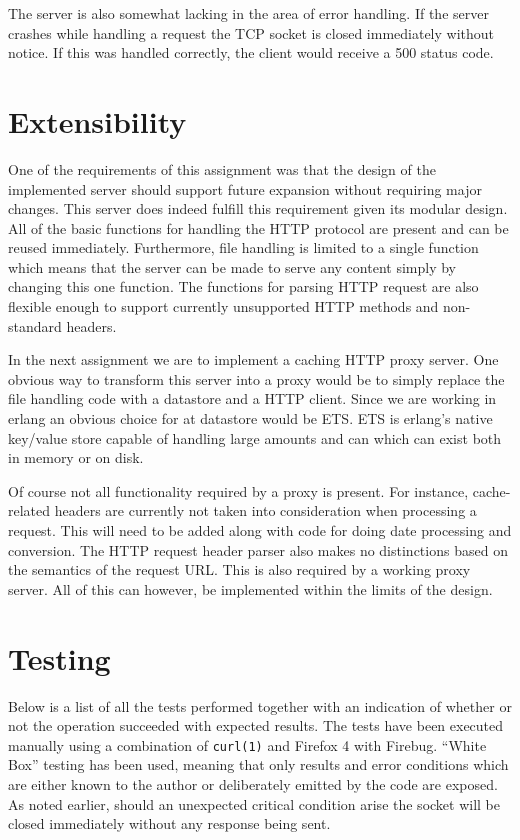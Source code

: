 \documentclass{sig-alternate}
\begin{document}
The server is also somewhat lacking in the area of error handling. If
the server crashes while handling a request the TCP socket is closed
immediately without notice. If this was handled correctly, the client
would receive a 500 status code.

\section{Extensibility}

One of the requirements of this assignment was that the design of the
implemented server should support future expansion without requiring
major changes. This server does indeed fulfill this requirement given
its modular design. All of the basic functions for handling the HTTP
protocol are present and can be reused immediately. Furthermore, file
handling is limited to a single function which means that the server
can be made to serve any content simply by changing this one
function. The functions for parsing HTTP request are also flexible
enough to support currently unsupported HTTP methods and non-standard
headers.

In the next assignment we are to implement a caching HTTP proxy
server. One obvious way to transform this server into a proxy would be
to simply replace the file handling code with a datastore and a HTTP
client. Since we are working in erlang an obvious choice for at
datastore would be ETS. ETS is erlang's native key/value store capable
of handling large amounts and can which can exist both in memory or on
disk.

Of course not all functionality required by a proxy is
present. For instance, cache-related headers are currently not taken into
consideration when processing a request. This will need to be added
along with code for doing date processing and conversion. The HTTP
request header parser also makes no distinctions based on the semantics
of the request URL. This is also required by a working proxy
server. All of this can however, be implemented within the limits of
the design.

\section{Testing}
Below is a list of all the tests performed together with an indication
of whether or not the operation succeeded with expected results. The
tests have been executed manually using a combination of
\verb!curl(1)! and Firefox 4 with Firebug. ``White Box'' testing has
been used, meaning that only results and error conditions which are
either known to the author or deliberately emitted by the code are
exposed. As noted earlier, should an unexpected critical condition
arise the socket will be closed immediately without any response being
sent.
\end{document}
